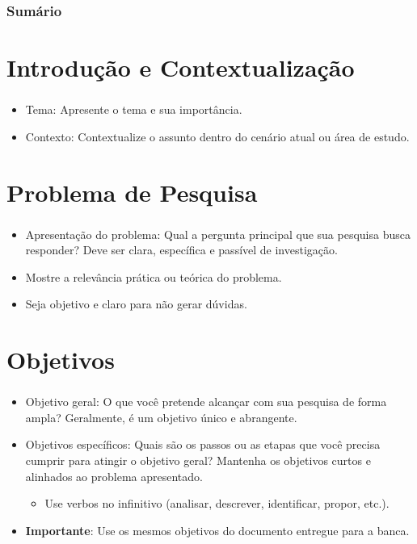 \documentclass[aspectratio=169]{beamer}
\author{Nome do autor}
\begin{document}
	
\frame{
	\titlepage
}
	
\begin{frame}[fragile]
	\frametitle{Sumário}
		\centering
		\tableofcontents
\end{frame}
	
\section{Introdução e Contextualização}
	
\begin{frame}[fragile]
	\frametitle{\secname}
	\begin{itemize}
		\item Tema: Apresente o tema e sua importância.
		\item Contexto: Contextualize o assunto dentro do cenário atual ou área de estudo.
	\end{itemize}
\end{frame}


\section{Problema de Pesquisa}

\begin{frame}[fragile]
	\frametitle{\secname}
	\begin{itemize}
		\item Apresentação do problema: Qual a pergunta principal que sua pesquisa busca responder? Deve ser clara, específica e passível de investigação.
		\item Mostre a relevância prática ou teórica do problema.
		\item Seja objetivo e claro para não gerar dúvidas.
	\end{itemize}
\end{frame}


\section{Objetivos}

\begin{frame}[fragile]
	\frametitle{\secname}
	\begin{itemize}
		\item Objetivo geral: O que você pretende alcançar com sua pesquisa de forma ampla? Geralmente, é um objetivo único e abrangente.
		\item Objetivos específicos: Quais são os passos ou as etapas que você precisa cumprir para atingir o objetivo geral? Mantenha os objetivos curtos e alinhados ao problema apresentado.
		\begin{itemize}
			\item Use verbos no infinitivo (analisar, descrever, identificar, propor, etc.).
		\end{itemize}
		\item \textbf{Importante}: Use os mesmos objetivos do documento entregue para a banca.
	\end{itemize}
\end{frame}
\end{document}
